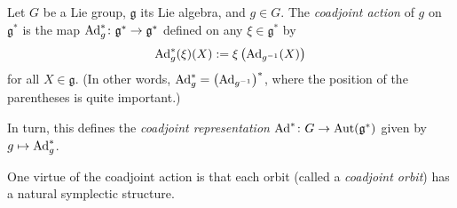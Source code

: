 \begin{definition}\label{def:coadjoint representation}
	Let $G$ be a Lie group, $\mathfrak{g}$ its Lie algebra, and $g \in G$. The \emph{coadjoint action} of $g$ on $\mathfrak{g}^\ast$ is the map $\operatorname{Ad}_g^\ast \colon\thinspace\! \mathfrak{g}^\ast \to \mathfrak{g}^\ast$ defined on any $\xi \in \mathfrak{g}^\ast$ by
	\[
		\operatorname{Ad}_g^\ast(\xi)(X) := \xi\left(\operatorname{Ad}_{g^{-1}}(X)\right)
	\]
	for all $X \in \mathfrak{g}$. (In other words, $\operatorname{Ad}_g^\ast = \left(\operatorname{Ad}_{g^{-1}}\right)^\ast$, where the position of the parentheses is quite important.)
	
	In turn, this defines the \emph{coadjoint representation} $\operatorname{Ad}^\ast \colon\thinspace\! G \to \operatorname{Aut}(\mathfrak{g}^\ast)$ given by $g \mapsto \operatorname{Ad}_g^\ast$.
\end{definition}

One virtue of the coadjoint action is that each orbit (called a \emph{coadjoint orbit}) has a natural symplectic structure.

